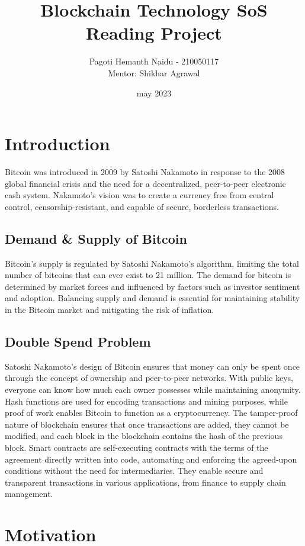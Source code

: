 \documentclass{report}
\title{Blockchain Technology SoS Reading Project}
\author{Pagoti Hemanth Naidu - 210050117 \\
Mentor: Shikhar Agrawal}
\date{may 2023}
\begin{document}
\maketitle
\section{Introduction}

Bitcoin was introduced in 2009 by Satoshi Nakamoto in response to the 2008 global financial crisis and the need for a decentralized, peer-to-peer electronic cash system. 
Nakamoto's vision was to create a currency free from central control, censorship-resistant, and capable of secure, borderless transactions.
\subsection{Demand \& Supply of Bitcoin}
Bitcoin's supply is regulated by Satoshi Nakamoto's algorithm, limiting the total number of bitcoins that can ever exist to 21 million.
The demand for bitcoin is determined by market forces and influenced by factors such as investor sentiment and adoption. 
Balancing supply and demand is essential for maintaining stability in the Bitcoin market and mitigating the risk of inflation.
\subsection{Double Spend Problem}
Satoshi Nakamoto's design of Bitcoin ensures that money can only be spent once through the concept of ownership and peer-to-peer networks. With public keys, everyone can know how much each owner possesses while maintaining anonymity. 
Hash functions are used for encoding transactions and mining purposes, while proof of work enables Bitcoin to function as a cryptocurrency. 
The tamper-proof nature of blockchain ensures that once transactions are added, they cannot be modified, and each block in the blockchain contains the hash of the previous block.
Smart contracts are self-executing contracts with the terms of the agreement directly written into code, automating and enforcing the agreed-upon conditions without the need for intermediaries. 
They enable secure and transparent transactions in various applications, from finance to supply chain management.
\section{Motivation}
\end{document}
